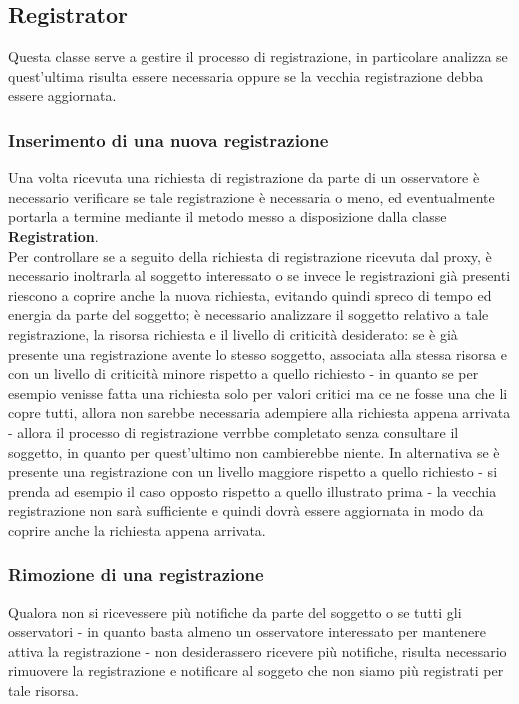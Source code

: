 \subsection{Registrator}
Questa classe serve a gestire il processo di registrazione, in particolare analizza se quest'ultima risulta essere necessaria oppure se la vecchia registrazione debba essere aggiornata. \\
\subsubsection{Inserimento di una nuova registrazione}
Una volta ricevuta una richiesta di registrazione da parte di un osservatore è necessario verificare se tale registrazione è necessaria o meno, ed eventualmente portarla a termine mediante il metodo messo a disposizione dalla classe \textbf{Registration}. \\
Per controllare se a seguito della richiesta di registrazione ricevuta dal proxy, è necessario inoltrarla al soggetto interessato o se invece le registrazioni già presenti riescono a coprire anche la nuova richiesta, evitando quindi spreco di tempo ed energia da parte del soggetto; è necessario analizzare il soggetto relativo a tale registrazione, la risorsa richiesta e il livello di criticità desiderato: se è già presente una registrazione avente lo stesso soggetto, associata alla stessa risorsa e con un livello di criticità minore rispetto a quello richiesto - in quanto se per esempio venisse fatta una richiesta solo per valori critici ma ce ne fosse una che li copre tutti, allora non sarebbe necessaria adempiere alla richiesta appena arrivata - allora il processo di registrazione verrbbe completato senza consultare il soggetto, in quanto per quest'ultimo non cambierebbe niente. In alternativa se è presente una registrazione con un livello maggiore rispetto a quello richiesto - si prenda ad esempio il caso opposto rispetto a quello illustrato prima - la vecchia registrazione non sarà sufficiente e quindi dovrà essere aggiornata in modo da coprire anche la richiesta appena arrivata. \\

\subsubsection{Rimozione di una registrazione}
Qualora non si ricevessere più notifiche da parte del soggetto o se tutti gli osservatori - in quanto basta almeno un osservatore interessato per mantenere attiva la registrazione - non desiderassero ricevere più notifiche, risulta necessario rimuovere la registrazione e notificare al soggeto che non siamo più registrati per tale risorsa. \\

